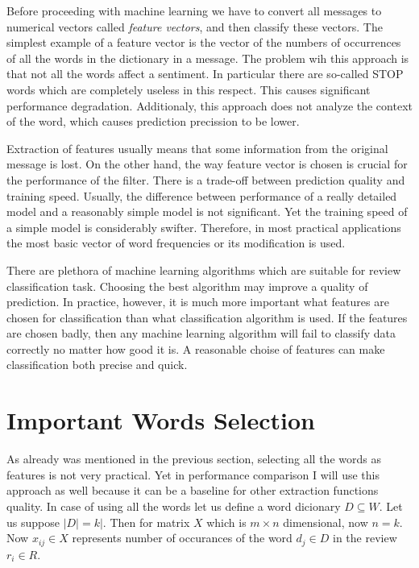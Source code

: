 \documentclass[12pt]{report}
\begin{document}
Before proceeding with machine learning we have to convert all messages to numerical vectors called \textit{feature vectors}, and then classify these vectors. The simplest example of a feature vector is the vector of the numbers of occurrences of all the words in the dictionary in a message. The problem wih this approach is that not all the words affect a sentiment. In particular there are so-called STOP words which are completely useless in this respect. This causes significant performance degradation. Additionaly, this approach does not analyze the context of the word, which causes prediction precission to be lower.

Extraction of features usually means that some information from the original message is lost. On the other hand, the way feature vector is chosen is crucial for the performance of the filter. There is a trade-off between prediction quality and training speed. Usually, the difference between performance of a really detailed model and a reasonably simple model is not significant. Yet the training speed of a simple model is considerably swifter. Therefore, in most practical applications the most basic vector of word frequencies or its modification is used.

There are plethora of machine learning algorithms which are suitable for review classification task. Choosing the best algorithm may improve a quality of prediction. In practice, however, it is much more important what features are chosen for classification than what classification algorithm is used. If the features are chosen badly, then any machine learning algorithm will fail to classify data correctly no matter how good it is. A reasonable choise of features can make classification both precise and quick.

\newpage

\section{Important Words Selection}

As already was mentioned in the previous section, selecting all the words as features is not very practical. Yet in performance comparison I will use this approach as well because it can be a baseline for other extraction functions quality. In case of using all the words let us define a word dicionary $D \subseteq W$. Let us suppose $|D| = k|$. Then for matrix $X$ which is $m \times n$ dimensional, now $n = k$. Now $x_{ij} \in X$ represents number of occurances of the word $d_j \in D$ in the review $r_i \in R$.
\end{document}

